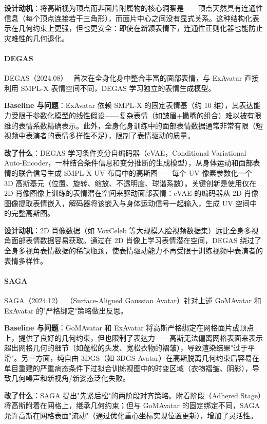 \textbf{设计动机}：将高斯视为顶点而非面片附属物的核心洞察是——顶点天然具有连通性信息（每个顶点连接若干三角形），而面片中心之间没有显式关系。这种结构化表示在几何约束上更强，但也更安全：即使在新颖表情下，连通性正则化器也能防止灾难性的几何退化。

\paragraph{DEGAS}

DEGAS（2024.08）~\cite{2408_10588} 首次在全身化身中整合丰富的面部表情，与 ExAvatar 直接利用 SMPL-X 表情空间不同，DEGAS 学习独立的表情生成模型。

\textbf{Baseline 与问题}：ExAvatar 依赖 SMPL-X 的固定表情基（约 10 维），其表达能力受限于参数化模型的线性假设——复杂表情（如皱眉+撇嘴的组合）难以被有限维的表情系数精确表示。此外，全身化身训练中的面部表情数据通常非常有限（短视频中表演者的表情多样性不足），限制了表情驱动的质量。

\textbf{改了什么}：DEGAS 学习条件变分自编码器（cVAE，Conditional Variational Auto-Encoder，一种结合条件信息和变分推断的生成模型），从身体运动和面部表情的联合信号生成 SMPL-X UV 布局中的高斯图——每个 UV 像素参数化一个 3D 高斯基元（位置、旋转、缩放、不透明度、球谐系数）。关键创新是使用仅在 2D 肖像图像上训练的表情潜在空间来驱动面部表情：cVAE 的编码器从 2D 肖像图像提取表情嵌入，解码器将该嵌入与身体运动信号一起输入，生成 UV 空间中的完整高斯图。

\textbf{设计动机}：2D 肖像数据（如 VoxCeleb 等大规模人脸视频数据集）远比全身多视角面部表情数据容易获取。通过在 2D 肖像上学习表情潜在空间，DEGAS 绕过了全身多视角表情数据的稀缺瓶颈，使表情驱动能力不再受限于训练视频中表演者的表情多样性。

\paragraph{SAGA}

SAGA（2024.12）~\cite{2412_00845}（Surface-Aligned Gaussian Avatar）针对上述 GoMAvatar 和 ExAvatar 的"严格绑定"策略做出反思。

\textbf{Baseline 与问题}：GoMAvatar 和 ExAvatar 将高斯严格绑定在网格面片或顶点上，提供了良好的几何约束，但也限制了表达力——高斯无法偏离网格表面来表示超出网格几何的细节（如蓬松的头发、宽松衣物的褶皱），导致渲染结果"过于平滑"。另一方面，纯自由 3DGS（如 3DGS-Avatar）在高斯脱离几何约束后容易在单目重建的严重病态条件下过拟合训练视图中的时变区域（衣物褶皱、阴影），导致几何噪声和新视角/新姿态泛化失败。

\textbf{改了什么}：SAGA 提出"先紧后松"的两阶段对齐策略。附着阶段（Adhered Stage）将高斯附着在网格上，继承几何约束；但与 GoMAvatar 的固定绑定不同，SAGA 允许高斯在网格表面"流动"（通过优化重心坐标实现位置更新），增加了灵活性。

